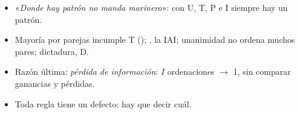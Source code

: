 \documentclass{article}
\begin{document}
\begin{columnas}
\begin{itemize}
  \begin{enumerate}
  \item \emph{Extremos}: si todos ponen $y$ en un extremo, la sociedad también.
  \item \emph{Votante pivote}: se sube $y$ de última a primera individuo a individuo; salta de golpe: quien la sube entonces, $n$, es \emph{pivote}.
  \item \emph{El pivote es dictador} (con la IAI): contradice D.
  \end{enumerate}
\item «\emph{Donde hay patrón no manda marinero}»: con U, T, P e I siempre hay un patrón.
\end{itemize}
\begin{itemize}
\item Mayoría por parejas incumple T (); , la IAI; unanimidad no ordena muchos pares; dictadura, D.
\item Razón última: \emph{pérdida de información}: $I$ ordenaciones $\to$ 1, sin comparar ganancias y pérdidas.
\item Toda regla tiene un defecto: hay que decir cuál.
\end{itemize}


\end{columnas}
\end{document}
